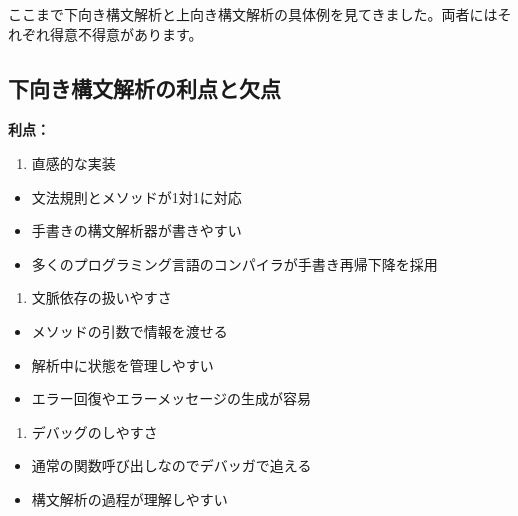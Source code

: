 ここまで下向き構文解析と上向き構文解析の具体例を見てきました。両者にはそれぞれ得意不得意があります。

\hypertarget{chapter5-ux4e0bux5411ux304dux69cbux6587ux89e3ux6790ux306eux5229ux70b9ux3068ux6b20ux70b9}{%
\subsection{下向き構文解析の利点と欠点}\label{chapter5-ux4e0bux5411ux304dux69cbux6587ux89e3ux6790ux306eux5229ux70b9ux3068ux6b20ux70b9}}

\textbf{利点：}

\begin{enumerate}
\def\labelenumi{\arabic{enumi}.}
\tightlist
\item
  直感的な実装
\end{enumerate}

\begin{itemize}
\tightlist
\item
  文法規則とメソッドが1対1に対応
\item
  手書きの構文解析器が書きやすい
\item
  多くのプログラミング言語のコンパイラが手書き再帰下降を採用
\end{itemize}

\begin{enumerate}
\def\labelenumi{\arabic{enumi}.}
\setcounter{enumi}{1}
\tightlist
\item
  文脈依存の扱いやすさ
\end{enumerate}

\begin{itemize}
\tightlist
\item
  メソッドの引数で情報を渡せる
\item
  解析中に状態を管理しやすい
\item
  エラー回復やエラーメッセージの生成が容易
\end{itemize}

\begin{enumerate}
\def\labelenumi{\arabic{enumi}.}
\setcounter{enumi}{2}
\tightlist
\item
  デバッグのしやすさ
\end{enumerate}

\begin{itemize}
\tightlist
\item
  通常の関数呼び出しなのでデバッガで追える
\item
  構文解析の過程が理解しやすい
\end{itemize}


